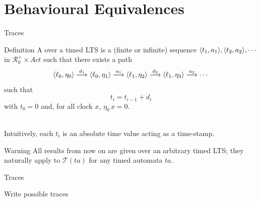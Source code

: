 \documentclass[aspectratio=169]{beamer}
\def\R{\mathcal{R}}
\def\TL#1{\mathcal{T}(#1)}
\begin{document}



\section{Behavioural Equivalences}

\begin{slide}{Traces}
\small

\begin{block}{Definition}
A  over a \alert{timed LTS} is a (finite or infinite) sequence  $\mathopen{\langle}t_1,a_1\mathclose{\rangle}, \mathopen{\langle}t_2,a_2\mathclose{\rangle}, \cdots$ in
 $\R^+_0 \times Act$ such that there exists a path
\begin{equation*}
\mathopen{\langle}\ell_0,\eta_0\mathclose{\rangle}  \stackrel{d_1}{\longrightarrow}   \mathopen{\langle}\ell_0,\eta_1\mathclose{\rangle}    \stackrel{a_1}{\longrightarrow}     \mathopen{\langle}\ell_1,\eta_2\mathclose{\rangle}    \stackrel{d_2}{\longrightarrow}    \mathopen{\langle}\ell_1,\eta_3\mathclose{\rangle}   \stackrel{a_2}{\longrightarrow} \cdots 
\end{equation*}
such that 
\begin{equation*}
t_{i} = t_{i-1} + d_i
\end{equation*}
with $t_0=0$ and, for all clock $x$, $\eta_0\, x = 0$.
\end{block}
~\\

Intuitively, each $t_i$ is an absolute time value acting as a \alert{time-stamp}.

\begin{alertblock}{Warning}
All results from now on are given over an arbitrary \alert{timed LTS}; they naturally apply to $\TL{ta}$ for any timed automata $ta$.
\end{alertblock}
\end{slide}



\begin{frame}{Traces}
\begin{exampleblock}{Write possible traces}
  \centering
\end{exampleblock}
\end{frame}
\end{document}
